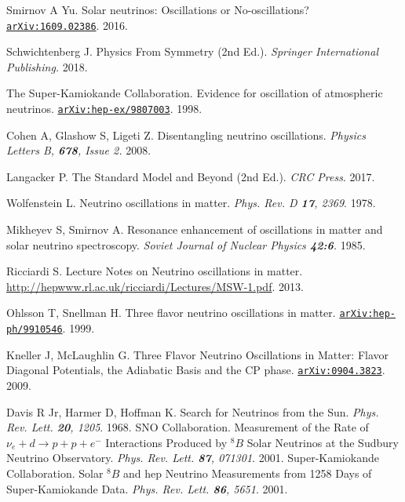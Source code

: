 \begin{thebibliography}{100}
	 Smirnov A Yu. Solar neutrinos: Oscillations or
		No-oscillations?
		\href{https://arxiv.org/abs/1609.02386}{\texttt{arXiv:1609.02386}}. 2016.



		

	 Schwichtenberg J. Physics From Symmetry (2nd Ed.).
		\textit{Springer International Publishing.} 2018.

	 The Super-Kamiokande Collaboration. Evidence for oscillation
		of atmospheric neutrinos.
		\href{https://arxiv.org/abs/hep-ex/9807003}{\texttt{arXiv:hep-ex/9807003}}. 1998.

	 Cohen A, Glashow S, Ligeti Z. Disentangling neutrino
		oscillations. \textit{Physics Letters B, \textbf{678}, Issue 2.} 2008.

	 Langacker P. The Standard Model and Beyond (2nd Ed.).
		\textit{CRC Press}. 2017.

	 Wolfenstein L. Neutrino oscillations in matter.
		\textit{Phys. Rev. D \textbf{17}, 2369}. 1978.

	 Mikheyev S, Smirnov A. Resonance enhancement of
		oscillations in matter and solar neutrino spectroscopy. \textit{Soviet
		Journal of Nuclear Physics \textbf{42:6}.} 1985.

	 Ricciardi S. Lecture Notes on Neutrino oscillations in
		matter.
		\url{http://hepwww.rl.ac.uk/ricciardi/Lectures/MSW-1.pdf}. 2013.

	 Ohlsson T, Snellman H. Three flavor neutrino oscillations
		in matter.
		\href{https://arxiv.org/abs/hep-ph/9910546v4}{\texttt{arXiv:hep-ph/9910546}}. 1999.

	 Kneller J, McLaughlin G. Three Flavor Neutrino Oscillations
		in Matter: Flavor Diagonal Potentials, the Adiabatic Basis and the CP
		phase. \href{https://arxiv.org/abs/0904.3823}{\texttt{arXiv:0904.3823}}. 2009.

	 Davis R Jr, Harmer D, Hoffman K. Search for Neutrinos from
		the Sun. \textit{Phys. Rev. Lett. \textbf{20}, 1205}. 1968.
	 SNO Collaboration. Measurement of the Rate of $\nu_e + d
		\rightarrow p + p + e^-$ 
		Interactions Produced by $^8B$ Solar Neutrinos at the Sudbury Neutrino
		Observatory. \textit{Phys. Rev. Lett. \textbf{87}, 071301}. 2001.
	 Super-Kamiokande Collaboration. Solar $^8B$ and hep
		Neutrino Measurements from 1258 Days of Super-Kamiokande Data.
		\textit{Phys. Rev. Lett. \textbf{86}, 5651}. 2001.


\end{thebibliography}
